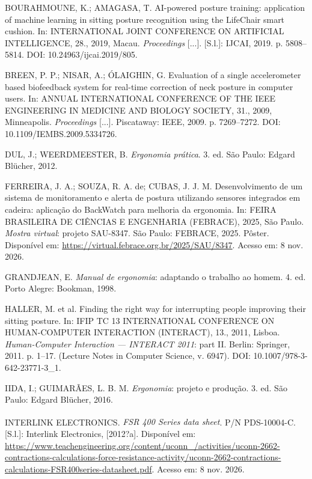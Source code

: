 \begin{singlespace}
\setlength{\parindent}{0pt}
\raggedright %
\setlength{\parskip}{0.6em}

BOURAHMOUNE, K.; AMAGASA, T. AI-powered posture training: application of machine
learning in sitting posture recognition using the LifeChair smart cushion. In:
INTERNATIONAL JOINT CONFERENCE ON ARTIFICIAL INTELLIGENCE, 28., 2019, Macau.
\emph{Proceedings} [...]. [S.l.]: IJCAI, 2019. p. 5808--5814. DOI:
10.24963/ijcai.2019/805.

BREEN, P. P.; NISAR, A.; ÓLAIGHIN, G. Evaluation of a single accelerometer based
biofeedback system for real-time correction of neck posture in computer users.
In: ANNUAL INTERNATIONAL CONFERENCE OF THE IEEE ENGINEERING IN MEDICINE AND
BIOLOGY SOCIETY, 31., 2009, Minneapolis. \emph{Proceedings} [...]. Piscataway:
IEEE, 2009. p. 7269--7272. DOI: 10.1109/IEMBS.2009.5334726.

DUL, J.; WEERDMEESTER, B. \emph{Ergonomia prática}. 3. ed. São Paulo: Edgard
Blücher, 2012.

FERREIRA, J. A.; SOUZA, R. A. de; CUBAS, J. J. M. Desenvolvimento de um sistema
de monitoramento e alerta de postura utilizando sensores integrados em cadeira:
aplicação do BackWatch para melhoria da ergonomia. In: FEIRA BRASILEIRA DE
CIÊNCIAS E ENGENHARIA (FEBRACE), 2025, São Paulo. \emph{Mostra virtual}:
projeto SAU-8347. São Paulo: FEBRACE, 2025. Pôster. Disponível em: \url{https://virtual.febrace.org.br/2025/SAU/8347}. Acesso em: 8 nov. 2026.

GRANDJEAN, E. \emph{Manual de ergonomia}: adaptando o trabalho ao homem. 4. ed.
Porto Alegre: Bookman, 1998.

HALLER, M. et al. Finding the right way for interrupting people improving their
sitting posture. In: IFIP TC 13 INTERNATIONAL CONFERENCE ON HUMAN-COMPUTER
INTERACTION (INTERACT), 13., 2011, Lisboa. \emph{Human-Computer Interaction ---
INTERACT 2011}: part II. Berlin: Springer, 2011. p. 1--17. (Lecture Notes in
Computer Science, v. 6947). DOI: 10.1007/978-3-642-23771-3\_1.

IIDA, I.; GUIMARÃES, L. B. M. \emph{Ergonomia}: projeto e produção. 3. ed. São
Paulo: Edgard Blücher, 2016.

INTERLINK ELECTRONICS. \emph{FSR\textsuperscript{\textregistered} 400 Series data
sheet}. P/N PDS-10004-C. [S.l.]: Interlink Electronics, [2012?a]. Disponível em: \url{https://www.teachengineering.org/content/uconn_/activities/uconn-2662-contractions-calculations-force-resistance-activity/uconn-2662-contractions-calculations-FSR400series-datasheet.pdf}.
Acesso em: 8 nov. 2026.


\end{singlespace}
